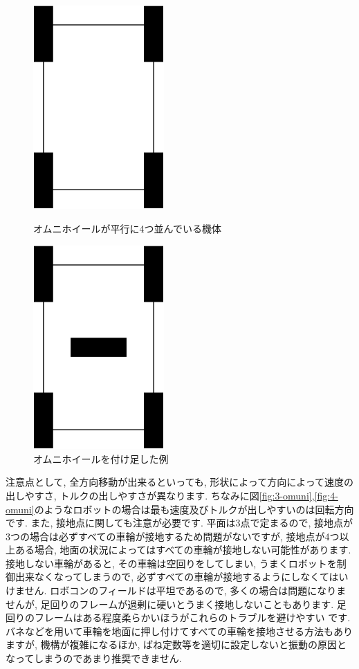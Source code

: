 \begin{figure}[h]
 \begin{minipage}{0.5\hsize}
  \begin{center}
   \includegraphics[width=50mm]{mecha/fig/fiji.eps}
  \end{center}
  \caption{オムニホイールが平行に4つ並んでいる機体}
  \label{fig:fiji}
 \end{minipage}
 \begin{minipage}{0.5\hsize}
  \begin{center}
   \includegraphics[width=50mm]{mecha/fig/fiji_imp.eps}
  \end{center}
  \caption{オムニホイールを付け足した例}
  \label{fig:fiji_imp}
 \end{minipage}
\end{figure}

注意点として, 全方向移動が出来るといっても, 形状によって方向によって速度の出しやすさ, トルクの出しやすさが異なります. ちなみに図\ref{fig:3-omuni},\ref{fig:4-omuni}のようなロボットの場合は最も速度及びトルクが出しやすいのは回転方向です. また, 接地点に関しても注意が必要です. 平面は3点で定まるので, 接地点が3つの場合は必ずすべての車輪が接地するため問題がないですが, 接地点が4つ以上ある場合, 地面の状況によってはすべての車輪が接地しない可能性があります. 接地しない車輪があると, その車輪は空回りをしてしまい, うまくロボットを制御出来なくなってしまうので, 必ずすべての車輪が接地するようにしなくてはいけません. ロボコンのフィールドは平坦であるので, 多くの場合は問題になりませんが, 足回りのフレームが過剰に硬いとうまく接地しないこともあります. 足回りのフレームはある程度柔らかいほうがこれらのトラブルを避けやすい
です. 
バネなどを用いて車輪を地面に押し付けてすべての車輪を接地させる方法もありますが, 機構が複雑になるほか, ばね定数等を適切に設定しないと振動の原因となってしまうのであまり推奨できません. 

